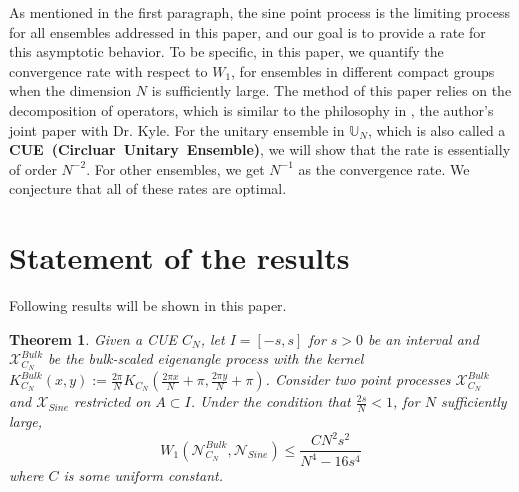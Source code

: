 \documentclass[11pt]{article}
\newtheorem{theorem}{Theorem}[section]
\numberwithin{equation}{section}%
\numberwithin{theorem}{section}
\begin{document}
As mentioned in the first paragraph, the sine point process is the limiting process for all ensembles addressed in this paper, and our goal is to provide a rate for this asymptotic behavior. To be specific, in this paper, we quantify the convergence rate with respect to $W_1$, for ensembles in different compact groups when the dimension $N$ is sufficiently large. The method of this paper relies on the decomposition of operators, which is similar to the philosophy in \cite{cai2025microscopicratesconvergencehermitian}, the author's joint paper with Dr. Kyle. For the unitary ensemble in $\mathbb{U}_N$, which is also called a \textbf{ CUE~(Circluar~Unitary~Ensemble)}, we will show that the rate is essentially of order $N^{-2}$. For other ensembles, we get $N^{-1}$ as the convergence rate. We conjecture that all of these rates are optimal.




 










\section{Statement of the results}
Following results will be shown in this paper.
\begin{theorem}\label{C bulk}
    Given a CUE $C_N$, let $I=[-s,s]$ for $s>0$ be an interval and $\mathcal{X}_{C_N}^{Bulk}$ be the bulk-scaled eigenangle process with the kernel $K_{C_N}^{Bulk}(x,y):=\frac{2\pi}{N}K_{C_N}(\frac{2\pi x}{N}+\pi,\frac{2\pi y}{N}+\pi)$. Consider two point processes $\mathcal{X}_{C_N}^{Bulk}$ and $\mathcal{X}_{Sine}$ restricted on $A\subset I$. Under the condition that $\frac{2s}{N}<1$, for $N$ sufficiently large, 
\begin{equation}\label{main CUE}
W_1(\mathcal{N}_{C_N}^{Bulk},\mathcal{N}_{Sine})\le \frac{CN^2s^2}{N^4-16s^4}
\end{equation}
where $C$ is some uniform constant.
\end{theorem}
\end{document}
